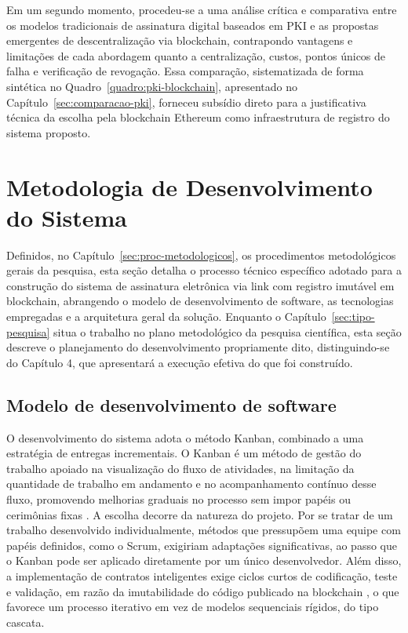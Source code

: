 \documentclass[
    12pt,
    a4paper,
    oneside,
    chapter=TITLE,
    section=TITLE,
    subsection=TITLE,
    subsubsection=TITLE,
    sumario=tradicional,
    english,
    brazil
]{abntex2}
\begin{document}
Em um segundo momento, procedeu-se a uma análise crítica e comparativa entre os modelos tradicionais de assinatura digital baseados em PKI e as propostas emergentes de descentralização via blockchain, contrapondo vantagens e limitações de cada abordagem quanto a centralização, custos, pontos únicos de falha e verificação de revogação. Essa comparação, sistematizada de forma sintética no Quadro~\ref{quadro:pki-blockchain}, apresentado no Capítulo~\ref{sec:comparacao-pki}, forneceu subsídio direto para a justificativa técnica da escolha pela blockchain Ethereum como infraestrutura de registro do sistema proposto.

\section{Metodologia de Desenvolvimento do Sistema}
\label{sec:metodologia-desenvolvimento}

Definidos, no Capítulo~\ref{sec:proc-metodologicos}, os procedimentos metodológicos gerais da pesquisa, esta seção detalha o processo técnico específico adotado para a construção do sistema de assinatura eletrônica via link com registro imutável em blockchain, abrangendo o modelo de desenvolvimento de software, as tecnologias empregadas e a arquitetura geral da solução. Enquanto o Capítulo~\ref{sec:tipo-pesquisa} situa o trabalho no plano metodológico da pesquisa científica, esta seção descreve o planejamento do desenvolvimento propriamente dito, distinguindo-se do Capítulo 4, que apresentará a execução efetiva do que foi construído.

\subsection{Modelo de desenvolvimento de software}

O desenvolvimento do sistema adota o método Kanban, combinado a uma estratégia de entregas incrementais. O Kanban é um método de gestão do trabalho apoiado na visualização do fluxo de atividades, na limitação da quantidade de trabalho em andamento e no acompanhamento contínuo desse fluxo, promovendo melhorias graduais no processo sem impor papéis ou cerimônias fixas \cite{anderson2010}. A escolha decorre da natureza do projeto. Por se tratar de um trabalho desenvolvido individualmente, métodos que pressupõem uma equipe com papéis definidos, como o Scrum, exigiriam adaptações significativas, ao passo que o Kanban pode ser aplicado diretamente por um único desenvolvedor. Além disso, a implementação de contratos inteligentes exige ciclos curtos de codificação, teste e validação, em razão da imutabilidade do código publicado na blockchain \cite{buterin2014}, o que favorece um processo iterativo em vez de modelos sequenciais rígidos, do tipo cascata.
\end{document}
